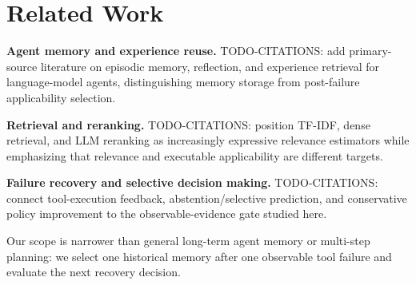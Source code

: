 \section{Related Work}

\textbf{Agent memory and experience reuse.} TODO-CITATIONS: add primary-source literature on episodic memory, reflection, and experience retrieval for language-model agents, distinguishing memory storage from post-failure applicability selection.

\textbf{Retrieval and reranking.} TODO-CITATIONS: position TF-IDF, dense retrieval, and LLM reranking as increasingly expressive relevance estimators while emphasizing that relevance and executable applicability are different targets.

\textbf{Failure recovery and selective decision making.} TODO-CITATIONS: connect tool-execution feedback, abstention/selective prediction, and conservative policy improvement to the observable-evidence gate studied here.

Our scope is narrower than general long-term agent memory or multi-step planning: we select one historical memory after one observable tool failure and evaluate the next recovery decision.

